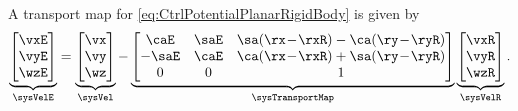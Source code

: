 A transport map for \eqref{eq:CtrlPotentialPlanarRigidBody} is given by\footnotemark
\begin{align}\label{eq:sysVelEPlanarRigidBody}
 \underbrace{\begin{bmatrix} \vxE \\ \vyE \\ \wzE \end{bmatrix}}_{\sysVelE}
 =
 \underbrace{\begin{bmatrix} \vx \\ \vy \\ \wz \end{bmatrix}}_{\sysVel}
 - 
 \underbrace{\begin{bmatrix}
  \caE & \saE & \sa(\rx \!-\! \rxR) - \ca(\ry \!-\! \ryR) \\
  -\saE & \caE & \ca(\rx \!-\! \rxR) + \sa(\ry \!-\! \ryR) \\
  0 & 0 & 1 
 \end{bmatrix}}_{\sysTransportMap}
 \underbrace{\begin{bmatrix} \vxR \\ \vyR \\ \wzR \end{bmatrix}}_{\sysVelR}.
\end{align}

